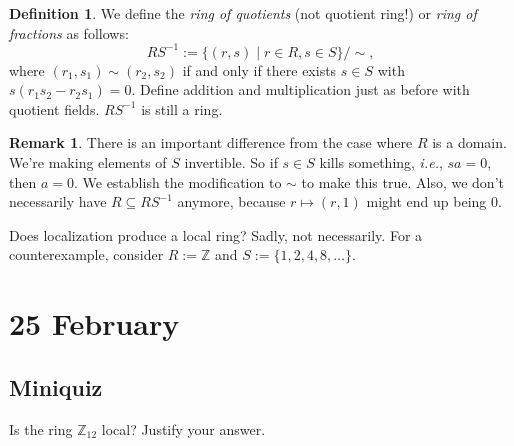 \documentclass[12pt]{article}
\newcommand{\z}{\mathbb{Z}}
\newcommand{\ita}[1]{\textit{#1}}
\theoremstyle{definition}
\newtheorem{definition}[theorem]{Definition}
\newtheorem*{remark}{Remark}
\begin{document}
\begin{definition}
    We define the \ita{ring of quotients} (not quotient ring!) or \ita{ring of fractions} as follows:
    \begin{equation}
        RS^{-1}:=\{(r,s)\mid r\in R,s\in S\}/\sim,
    \end{equation}
    where $(r_1,s_1)\sim(r_2,s_2)$ if and only if there exists $s\in S$ with $s(r_1s_2-r_2s_1)=0$. Define addition and multiplication just as before with quotient fields. $RS^{-1}$ is still a ring.
\end{definition}
\begin{remark}
   There is an important difference from the case where $R$ is a domain. We're making elements of $S$ invertible. So if $s\in S$ kills something, \ita{i.e.}, $sa=0$, then $a=0$. We establish the modification to $\sim$ to make this true. Also, we don't necessarily have $R\subseteq RS^{-1}$ anymore, because $r\mapsto(r,1)$ might end up being 0.
\end{remark}
Does localization produce a local ring? Sadly, not necessarily. For a counterexample, consider $R:=\z$ and $S:=\{1,2,4,8,\dotsc\}$.
\section{25 February}
\subsection{Miniquiz}
Is the ring $\z_{12}$ local? Justify your answer.
\end{document}
